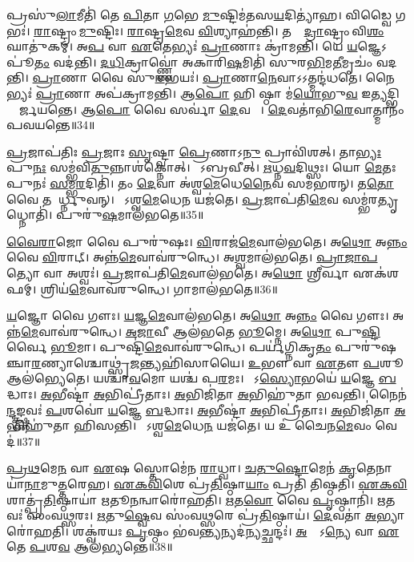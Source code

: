 𑌪𑍍𑌰𑌸𑍁॑\ul{𑌲𑌾}𑌮𑍀𑌤𑌿॑ 𑌤𑍇 \ul{𑌪𑌿}𑌤𑌾 \ul{𑌗}𑌭𑍇 \ul{𑌮𑍁}𑌷𑍍𑌟𑌿𑌮॑𑌤𑌸\ul{𑌯}𑌦𑌿𑌤𑍍𑌯𑌾॑𑌹।
𑌵𑌿𑌡𑍍𑌵𑍈 𑌗𑌭𑌃॑।
\ul{𑌰𑌾}𑌷𑍍𑌟𑍍𑌰𑌂 \ul{𑌮𑍁}𑌷𑍍𑌟𑌿𑌃।
\ul{𑌰𑌾}𑌷𑍍𑌟𑍍𑌰\ul{𑌮𑍇}𑌵 \ul{𑌵𑌿}𑌶𑍍𑌯𑌾𑌹॑𑌨𑍍𑌤𑌿।
𑌤𑌸𑍍𑌮𑌾᳚\ul{𑌦𑍍𑌰𑌾}𑌷𑍍𑌟𑍍𑌰𑌂 𑌵𑌿\ul{𑌶𑌂} 𑌘𑌾𑌤𑍁॑𑌕𑌮𑍍।
𑌅\ul{𑌪} 𑌵𑌾 \ul{𑌏}𑌤𑍇𑌭𑍍𑌯𑌃॑ \ul{𑌪𑍍𑌰𑌾}𑌣𑌾𑌃 𑌕𑍍𑌰𑌾॑𑌮𑌨𑍍𑌤𑌿।
𑌯𑍇 \ul{𑌯}𑌜𑍍𑌞𑍇\-𑌽𑌪𑍂॑\ul{𑌤𑌂} 𑌵𑌦॑𑌨𑍍𑌤𑌿।
\ul{𑌦}\ul{𑌧𑌿}𑌕𑍍𑌰𑌾𑌵𑍍𑌣𑍍𑌣𑍋॑ 𑌅𑌕𑌾𑌰𑌿\ul{𑌷}𑌮𑌿𑌤𑌿॑ 𑌸𑍁𑌰\ul{𑌭𑌿}𑌮\ul{𑌤𑍀}𑌮𑍃𑌚𑌂॑ 𑌵𑌦𑌨𑍍𑌤𑌿।
\ul{𑌪𑍍𑌰𑌾}𑌣𑌾 𑌵𑍈 𑌸𑍁॑\ul{𑌰}𑌭𑌯𑌃॑।
\ul{𑌪𑍍𑌰𑌾}𑌣𑌾\ul{𑌨𑍇}𑌵𑌾𑌽𑌽𑌤𑍍𑌮𑌨𑍍𑌦॑𑌧𑌤𑍇।
𑌨𑍈𑌭𑍍𑌯𑌃॑ \ul{𑌪𑍍𑌰𑌾}𑌣𑌾 𑌅𑌪॑𑌕𑍍𑌰𑌾𑌮𑌨𑍍𑌤𑌿।
𑌆\ul{𑌪𑍋} 𑌹𑌿 𑌷𑍍𑌠𑌾 𑌮॑\ul{𑌯𑍋}𑌭𑍁\ul{𑌵} 𑌇\ul{𑌤𑍍𑌯}𑌦𑍍𑌭𑌿𑌰𑍍𑌮𑌾᳚𑌰𑍍𑌜𑌯𑌨𑍍𑌤𑍇।
𑌆\ul{𑌪𑍋} 𑌵𑍈 𑌸𑌰𑍍𑌵𑌾॑ \ul{𑌦𑍇}𑌵𑌤𑌾𑌃᳚।
\ul{𑌦𑍇}𑌵𑌤𑌾॑𑌭𑌿\ul{𑌰𑍇}𑌵𑌾𑌤𑍍𑌮𑌾𑌨𑌂॑ 𑌪𑌵𑌯𑌨𑍍𑌤𑍇॥34॥\anuvakamend[\ul{𑌰𑌾}𑌷𑍍𑌟𑍍𑌰\ul{𑌸𑍍𑌯} 𑌮\ul{𑌧𑍍𑌯𑌂} 𑌪𑍁𑌷𑍍𑌯॑\ul{𑌤𑌿} 𑌗𑌭𑍋॑ 𑌰𑍁𑌨𑍍𑌧𑍇 𑌦𑌧𑌤𑍇 \ul{𑌚}𑌤𑍍𑌵𑌾𑌰𑌿॑ 𑌚]

\ul{𑌪𑍍𑌰}𑌜𑌾𑌪॑𑌤𑌿𑌃 \ul{𑌪𑍍𑌰}𑌜𑌾𑌃 \ul{𑌸𑍃}𑌷𑍍𑌟𑍍𑌵𑌾 \ul{𑌪𑍍𑌰𑍇}𑌣𑌾𑌽\ul{𑌨𑍁} 𑌪𑍍𑌰𑌾𑌵𑌿॑𑌶𑌤𑍍।
𑌤𑌾\ul{𑌭𑍍𑌯𑌃} 𑌪𑍁\ul{𑌨𑌃} 𑌸𑌮𑍍𑌭॑𑌵𑌿\ul{𑌤𑍁}𑌨𑍍𑌨𑌾𑌶॑𑌕𑍍𑌨𑍋𑌤𑍍।
𑌸𑍋᳚𑌽𑌬𑍍𑌰𑌵𑍀𑌤𑍍।
\ul{𑌋}𑌧𑍍𑌨\ul{𑌵}𑌦𑌿𑌥𑍍𑌸𑌃।
𑌯𑍋 \ul{𑌮𑍇}𑌤𑌃 𑌪𑍁𑌨𑌃॑ \ul{𑌸}𑌮𑍍𑌭\ul{𑌰}𑌦𑌿𑌤𑌿॑।
𑌤𑌂 \ul{𑌦𑍇}𑌵𑌾 𑌅॑𑌶𑍍𑌵\ul{𑌮𑍇}𑌧𑍇\ul{𑌨𑍈}𑌵 𑌸𑌮॑𑌭𑌰𑌨𑍍।
𑌤\ul{𑌤𑍋} 𑌵𑍈 𑌤 𑌆᳚𑌰𑍍𑌧𑍍𑌨𑍁𑌵𑌨𑍍।
𑌯𑍋᳚𑌽𑌶𑍍𑌵\ul{𑌮𑍇}𑌧𑍇\ul{𑌨} 𑌯𑌜॑𑌤𑍇।
\ul{𑌪𑍍𑌰}𑌜𑌾𑌪॑𑌤𑌿\ul{𑌮𑍇}𑌵 𑌸𑌮𑍍𑌭॑𑌰\ul{𑌤𑍍𑌯𑍃}𑌧𑍍𑌨𑍋𑌤𑌿॑।
𑌪𑍁𑌰𑍁॑\ul{𑌷}𑌮𑌾𑌲॑𑌭𑌤𑍇॥35॥

\ul{𑌵𑍈}\ul{𑌰𑌾}𑌜𑍋 𑌵𑍈 𑌪𑍁𑌰𑍁॑𑌷𑌃।
\ul{𑌵𑌿}𑌰𑌾𑌜॑\ul{𑌮𑍇}𑌵𑌾𑌲॑𑌭𑌤𑍇।
𑌅\ul{𑌥𑍋} 𑌅\ul{𑌨𑍍𑌨𑌂} 𑌵𑍈 \ul{𑌵𑌿}𑌰𑌾𑌟𑍍।
𑌅𑌨𑍍𑌨॑\ul{𑌮𑍇}𑌵𑌾𑌵॑𑌰𑍁𑌨𑍍𑌧𑍇।
𑌅\ul{𑌶𑍍𑌵}𑌮𑌾𑌲॑𑌭𑌤𑍇।
\ul{𑌪𑍍𑌰𑌾}\ul{𑌜𑌾}\ul{𑌪}𑌤𑍍𑌯𑍋 𑌵𑌾 𑌅𑌶𑍍𑌵𑌃॑।
\ul{𑌪𑍍𑌰}𑌜𑌾𑌪॑𑌤𑌿\ul{𑌮𑍇}𑌵𑌾𑌲॑𑌭𑌤𑍇।
𑌅\ul{𑌥𑍋} 𑌶𑍍𑌰𑍀𑌰𑍍𑌵𑌾 𑌏𑌕॑𑌶𑌫𑌮𑍍।
𑌶𑍍𑌰𑌿𑌯॑\ul{𑌮𑍇}𑌵𑌾𑌵॑𑌰𑍁𑌨𑍍𑌧𑍇।
𑌗𑌾𑌮𑌾𑌲॑𑌭𑌤𑍇॥36॥

\ul{𑌯}𑌜𑍍𑌞𑍋 𑌵𑍈 𑌗𑍗𑌃।
\ul{𑌯}𑌜𑍍𑌞\ul{𑌮𑍇}𑌵𑌾𑌲॑𑌭𑌤𑍇।
𑌅\ul{𑌥𑍋} 𑌅\ul{𑌨𑍍𑌨𑌂} 𑌵𑍈 𑌗𑍗𑌃।
𑌅𑌨𑍍𑌨॑\ul{𑌮𑍇}𑌵𑌾𑌵॑𑌰𑍁𑌨𑍍𑌧𑍇।
\ul{𑌅}\ul{𑌜𑌾}𑌵𑍀 𑌆𑌲॑𑌭𑌤𑍇 \ul{𑌭𑍂}𑌮𑍍𑌨𑍇।
𑌅\ul{𑌥𑍋} 𑌪𑍁\ul{𑌷𑍍𑌟𑌿}𑌰𑍍𑌵𑍈 \ul{𑌭𑍂}𑌮𑌾।
𑌪𑍁𑌷𑍍𑌟𑌿॑\ul{𑌮𑍇}𑌵𑌾𑌵॑𑌰𑍁𑌨𑍍𑌧𑍇।
𑌪𑌰𑍍𑌯॑𑌗𑍍𑌨𑌿𑌕𑍃\ul{𑌤𑌂} 𑌪𑍁𑌰𑍁॑𑌷𑌞𑍍𑌚𑌾\ul{𑌰}𑌣𑍍𑌯𑌾𑌶𑍍𑌚𑍋𑌥𑍍𑌸𑍃॑\ul{𑌜}𑌨𑍍𑌤𑍍𑌯𑌹𑌿॑𑌸𑌾𑌯𑍈।
\ul{𑌉}𑌭𑍗 𑌵𑌾 \ul{𑌏}𑌤𑍗 \ul{𑌪}𑌶𑍂 𑌆𑌲॑𑌭𑍍𑌯𑍇𑌤𑍇।
𑌯𑌶𑍍𑌚𑌾॑\ul{𑌵}𑌮𑍋 𑌯𑌶𑍍𑌚॑ 𑌪\ul{𑌰}𑌮𑌃।
𑌤𑍇᳚𑌽\ul{𑌸𑍍𑌯𑍋}𑌭𑌯𑍇॑ \ul{𑌯}𑌜𑍍𑌞𑍇 \ul{𑌬}𑌦𑍍𑌧𑌾𑌃।
\ul{𑌅}𑌭𑍀𑌷𑍍𑌟𑌾॑ \ul{𑌅}𑌭𑌿𑌪𑍍𑌰𑍀॑𑌤𑌾𑌃।
\ul{𑌅}𑌭𑌿𑌜𑌿॑𑌤𑌾 \ul{𑌅}𑌭𑌿𑌹𑍁॑𑌤𑌾 𑌭𑌵𑌨𑍍𑌤𑌿।
𑌨𑍈𑌨॑\ul{𑌨𑍍𑌦}𑌙𑍍𑌕𑍍𑌷𑍍𑌣𑌵𑌃॑ \ul{𑌪}𑌶𑌵𑍋॑ \ul{𑌯}𑌜𑍍𑌞𑍇 \ul{𑌬}𑌦𑍍𑌧𑌾𑌃।
\ul{𑌅}𑌭𑍀𑌷𑍍𑌟𑌾॑ \ul{𑌅}𑌭𑌿𑌪𑍍𑌰𑍀॑𑌤𑌾𑌃।
\ul{𑌅}𑌭𑌿𑌜𑌿॑𑌤𑌾 \ul{𑌅}𑌭𑌿𑌹𑍁॑𑌤𑌾 𑌹𑌿𑌸𑌨𑍍𑌤𑌿।
𑌯𑍋᳚𑌽𑌶𑍍𑌵\ul{𑌮𑍇}𑌧𑍇\ul{𑌨} 𑌯𑌜॑𑌤𑍇।
𑌯 𑌉॑ 𑌚𑍈𑌨\ul{𑌮𑍇}𑌵𑌂 𑌵𑍇𑌦॑॥37॥\anuvakamend[\ul{𑌲}\ul{𑌭}\ul{𑌤𑍇} 𑌗𑌾𑌮𑌾𑌲॑𑌭𑌤𑍇 𑌪\ul{𑌰}𑌮𑍋᳚\-𑌽𑌷𑍍𑌟𑍗 𑌚॑]

\ul{𑌪𑍍𑌰}\ul{𑌥}𑌮𑍇\ul{𑌨} 𑌵𑌾 \ul{𑌏}𑌷 𑌸𑍍𑌤𑍋𑌮𑍇॑𑌨 \ul{𑌰𑌾}𑌧𑍍𑌵𑌾।
\ul{𑌚}\ul{𑌤𑍁}\ul{𑌷𑍍𑌟𑍋}𑌮𑍇𑌨॑ \ul{𑌕𑍃}𑌤𑍇𑌨𑌾𑌯𑌾॑\ul{𑌨𑌾}𑌮𑍁\ul{𑌤𑍍𑌤}𑌰𑍇𑌹\sn{}।
\ul{𑌏}\ul{𑌕}\ul{𑌵𑌿}\ul{}𑌶𑍇 𑌪𑍍𑌰॑\ul{𑌤𑌿}𑌷𑍍𑌠𑌾\ul{𑌯𑌾𑌂} 𑌪𑍍𑌰𑌤𑌿॑ 𑌤𑌿𑌷𑍍𑌠𑌤𑌿।
\ul{𑌏}\ul{𑌕}\ul{𑌵𑌿}\ul{}𑌶𑌾𑌤𑍍𑌪𑍍𑌰॑\ul{𑌤𑌿}𑌷𑍍𑌠𑌾𑌯𑌾॑ \ul{𑌋}𑌤𑍂\ul{𑌨}𑌨𑍍𑌵𑌾𑌰𑍋॑𑌹𑌤𑌿।
\ul{𑌋}𑌤\ul{𑌵𑍋} 𑌵𑍈 \ul{𑌪𑍃}𑌷𑍍𑌠𑌾𑌨𑌿॑।
\ul{𑌋}𑌤𑌵𑌃॑ 𑌸𑌂𑌵\ul{𑌥𑍍𑌸}𑌰𑌃।
\ul{𑌋}𑌤𑍁\ul{𑌷𑍍𑌵𑍇}𑌵 𑌸𑌂॑𑌵\ul{𑌥𑍍𑌸}𑌰𑍇 𑌪𑍍𑌰॑\ul{𑌤𑌿}𑌷𑍍𑌠𑌾𑌯॑।
\ul{𑌦𑍇}𑌵𑌤𑌾॑ \ul{𑌅}𑌭𑍍𑌯𑌾𑌰𑍋॑𑌹𑌤𑌿।
𑌶𑌕𑍍𑌵॑𑌰𑌯𑌃 \ul{𑌪𑍃}𑌷𑍍𑌠𑌂 𑌭॑𑌵\ul{𑌨𑍍𑌤𑍍𑌯}𑌨𑍍𑌯𑌦॑\ul{𑌨𑍍𑌯}𑌚𑍍𑌛𑌨𑍍𑌦𑌃॑।
\ul{𑌅}𑌨𑍍𑌯𑍇᳚\-𑌽\ul{𑌨𑍍𑌯𑍇} 𑌵𑌾 \ul{𑌏}𑌤𑍇 \ul{𑌪}𑌶\ul{𑌵} 𑌆𑌲॑𑌭𑍍𑌯𑌨𑍍𑌤𑍇॥38॥

